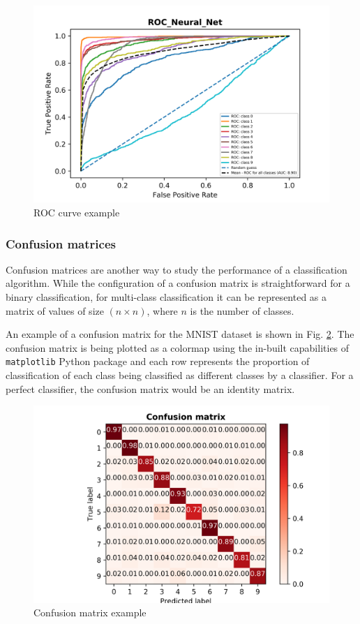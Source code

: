 \documentclass[10pt]{scrartcl}
\begin{document}
\noindent\fbox{\parbox{\textwidth}{}}

\begin{figure}
\centering
\includegraphics[width=0.6\linewidth]{figures/roc_example.png}
\caption{ROC curve example \label{fig:roc_eg}}
\end{figure}

\subsubsection*{Confusion matrices}

Confusion matrices are another way to study the performance of a classification algorithm. While the configuration of a confusion matrix is straightforward for a binary classification, for multi-class classification it can be represented as a matrix of values of size $(n \times n)$, where $n$ is the number of classes.

An example of a confusion matrix for the MNIST dataset is shown in Fig. \ref{fig:conf_eg}. The confusion matrix is being plotted as a colormap using the in-built capabilities of \texttt{matplotlib} Python package and each row represents the proportion of classification of each class being classified as different classes by a classifier. For a perfect classifier, the confusion matrix would be an identity matrix.

\begin{figure}[H]
\centering
\includegraphics[width=0.6\linewidth]{figures/confusion_example.png}
\caption{Confusion matrix example \label{fig:conf_eg}}
\end{figure}
\end{document}
